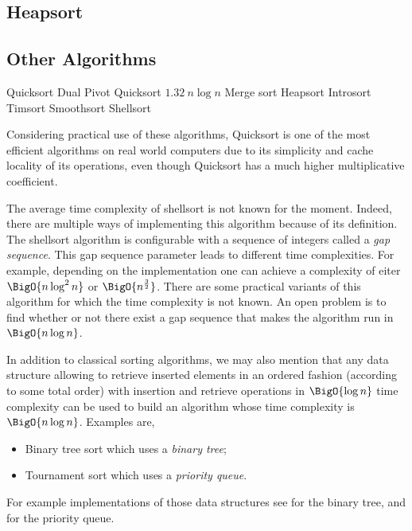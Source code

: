 \subsection*{Heapsort}

\subsection*{Other Algorithms}

Quicksort \cite{hoare:1962}
Dual Pivot Quicksort \(1.32~n \log n\) \cite{yaroslavskiy:2009}
Merge sort  \cite{leiserson:2001,goldstine:1948}
Heapsort  \cite{leiserson:2001}
Introsort  \cite{musser:1997}
Timsort \cite{martelli:2006}
Smoothsort \cite{dijkstra:1982}
Shellsort \cite{shell:1959}

Considering practical use of these algorithms, Quicksort is one of the most
efficient algorithms on real world computers due to its simplicity and cache
locality of its operations, even though Quicksort has a much higher
multiplicative coefficient.

The average time complexity of shellsort is not known for the moment. Indeed,
there are multiple ways of implementing this algorithm because of its
definition. The shellsort algorithm is configurable with a sequence of integers
called a \emph{gap sequence}. This gap sequence parameter leads to different
time complexities. For example, depending on the implementation one can achieve
a complexity of eiter $\BigO{n \log^2 n}$ or $\BigO{n^{\frac{3}{2}}}$. There
are some practical variants of this algorithm for which the time complexity is
not known. An open problem is to find whether or not there exist a gap sequence
that makes the algorithm run in $\BigO{n \log n}$.

In addition to classical sorting algorithms, we may also
mention that any data structure allowing to retrieve inserted elements in an
ordered fashion (according to some total order) with insertion and retrieve
operations in $\BigO{\log n}$ time complexity can be used to build an algorithm
whose time complexity is $\BigO{n \log n}$. Examples are,

\begin{itemize}
\item Binary tree sort which uses a \emph{binary tree};
\item Tournament sort which uses a \emph{priority queue}.
\end{itemize}

For example implementations of those data structures see
\citet*{sleator:1985} for the binary tree, and
\citet*{leiserson:2001} for the priority queue.
